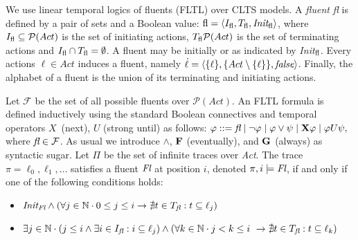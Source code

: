 
We use linear temporal logics of fluents (FLTL) over CLTS models. %
A \emph{fluent} \emph{fl} is defined by a pair of sets and a Boolean value: $\emph{\emph{fl}} = \langle I_{\emph{\emph{fl}}}, T_{\emph{\emph{fl}}}, \emph{Init}_{\emph{\emph{fl}}} \rangle$, where $I_{\emph{\emph{fl}}}\subseteq \mathcal{P}(Act)$ is the set of initiating actions, $T_{\emph{\emph{fl}}} \mathcal{P}(Act)$ is the set of terminating actions and $I_{\emph{\emph{fl}}}\cap T_{\emph{\emph{fl}}}=\emptyset$. 
A fluent may be initially \true or \false as indicated by \emph{Init}$_{\emph{\emph{fl}}}$. 
Every actions $\ell\in Act$ induces a fluent, namely $\dot{\ell}=\langle \{\ell\}, \{Act\setminus \{\ell\}\}, \emph{false}\rangle$. 
Finally, the alphabet of a fluent is the union of its terminating and initiating actions.

Let $\mathcal{F}$ be the set of all possible fluents over $\mathcal{P}(Act)$. 
An FLTL formula is defined inductively using the standard Boolean connectives and temporal operators $X$~(next), $U$ (strong until) as follows: 
$\varphi ::= \emph{fl} \mid \neg \varphi \mid \varphi \vee \psi \mid {\bf X} \varphi \mid \varphi U \psi,$
where $\emph{fl}\in\mathcal{F}$. 
As usual we introduce $\wedge$, ${\bf F}$ (eventually), and ${\bf G}$ (always) as syntactic sugar. 
Let $\Pi$ be the set of infinite traces over \emph{Act}.
The trace $\pi=\ell_0,\ell_1,\ldots$ satisfies a fluent $\emph{Fl}$ at position $i$, denoted $\pi,i \models \emph{Fl}$, if and only if one of the following conditions holds:
\begin{itemize}%
	\item $\emph{Init}_{\emph{Fl}} \wedge (\forall j \in \mathbb{N} \cdot 0 \leq j \leq i \rightarrow \nexists t \in T_{\emph{fl}}: t \subseteq \ell_j)$
	\item $\exists j \in \mathbb{N} \cdot (j \leq i \wedge \exists i \in I_{\emph{fl}}: i \subseteq \ell_j) \wedge (\forall k \in \mathbb{N} \cdot j < k \leq i \ \rightarrow \nexists t \in T_{\emph{fl}}: t \subseteq \ell_k)$
\end{itemize}

